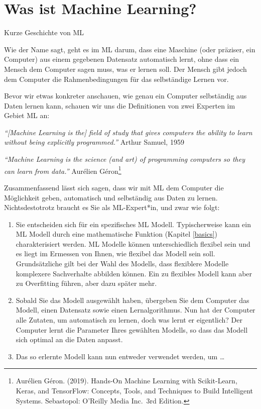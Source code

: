 \documentclass[
]{book}
\providecommand{\tightlist}{%
  \setlength{\itemsep}{0pt}\setlength{\parskip}{0pt}}
\begin{document}
\hypertarget{was-ist-machine-learning}{%
\section{Was ist Machine Learning?}\label{was-ist-machine-learning}}

Kurze Geschichte von ML

Wie der Name sagt, geht es im ML darum, dass eine Maschine (oder präziser, ein Computer) aus einem gegebenen Datensatz automatisch lernt, ohne dass ein Mensch dem Computer sagen muss, was er lernen soll. Der Mensch gibt jedoch dem Computer die Rahmenbedingungen für das selbständige Lernen vor.

Bevor wir etwas konkreter anschauen, wie genau ein Computer selbständig aus Daten lernen kann, schauen wir uns die Definitionen von zwei Experten im Gebiet ML an:

\emph{``{[}Machine Learning is the{]} field of study that gives computers the ability to learn without being explicitly programmed.''} Arthur Samuel, 1959

\emph{``Machine Learning is the science (and art) of programming computers so they can learn from data.''} Aurélien Géron\footnote{Aurélien Géron. (2019). Hands-On Machine Learning with Scikit-Learn, Keras, and TensorFlow: Concepts, Tools, and Techniques to Build Intelligent Systems. Sebastopol: O'Reilly Media Inc.~3rd Edition.}

Zusammenfassend lässt sich sagen, dass wir mit ML dem Computer die Möglichkeit geben, automatisch und selbständig aus Daten zu lernen. Nichtsdestotrotz braucht es Sie als ML-Expert*in, und zwar wie folgt:

\begin{enumerate}
\def\labelenumi{\arabic{enumi}.}
\tightlist
\item
  Sie entscheiden sich für ein spezifisches ML Modell. Typischerweise kann ein ML Modell durch eine mathematische Funktion (Kapitel \ref{basics}) charakterisiert werden. ML Modelle können unterschiedlich flexibel sein und es liegt im Ermessen von Ihnen, wie flexibel das Modell sein soll. Grundsätzliche gilt bei der Wahl des Modells, dass flexiblere Modelle komplexere Sachverhalte abbilden können. Ein zu flexibles Modell kann aber zu Overfitting führen, aber dazu später mehr.
\item
  Sobald Sie das Modell ausgewählt haben, übergeben Sie dem Computer das Modell, einen Datensatz sowie einen Lernalgorithmus. Nun hat der Computer alle Zutaten, um automatisch zu lernen, doch was lernt er eigentlich? Der Computer lernt die Parameter Ihres gewählten Modells, so dass das Modell sich optimal an die Daten anpasst.
\item
  Das so erlernte Modell kann nun entweder verwendet werden, um \ldots{}
\end{enumerate}
\end{document}
